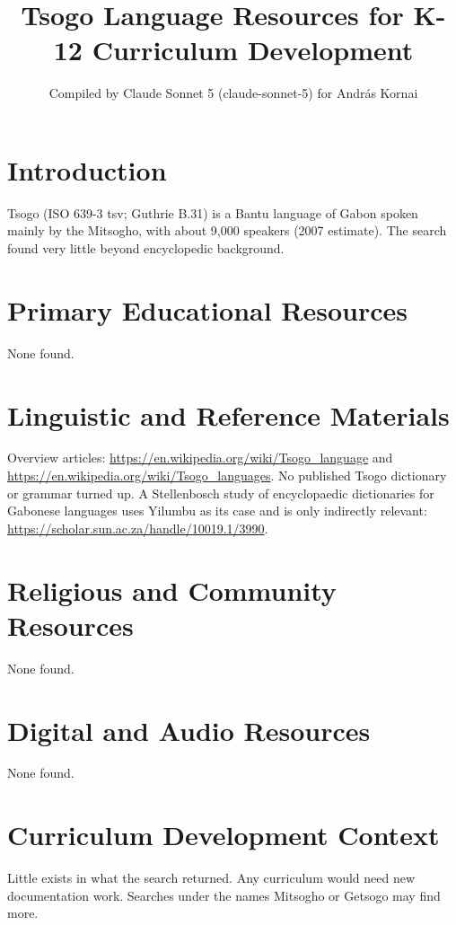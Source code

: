 \documentclass[12pt]{article}
\title{Tsogo Language Resources for K-12 Curriculum Development}
\author{Compiled by Claude Sonnet 5 (claude-sonnet-5) for Andr\'as Kornai}
\date{}
\begin{document}
\maketitle
\section{Introduction}
Tsogo (ISO 639-3 tsv; Guthrie B.31) is a Bantu language of Gabon spoken mainly by the Mitsogho, with about 9,000 speakers (2007 estimate). The search found very little beyond encyclopedic background.
\section{Primary Educational Resources}
None found.
\section{Linguistic and Reference Materials}
Overview articles: \url{https://en.wikipedia.org/wiki/Tsogo_language} and \url{https://en.wikipedia.org/wiki/Tsogo_languages}. No published Tsogo dictionary or grammar turned up. A Stellenbosch study of encyclopaedic dictionaries for Gabonese languages uses Yilumbu as its case and is only indirectly relevant: \url{https://scholar.sun.ac.za/handle/10019.1/3990}.
\section{Religious and Community Resources}
None found.
\section{Digital and Audio Resources}
None found.
\section{Curriculum Development Context}
Little exists in what the search returned. Any curriculum would need new documentation work. Searches under the names Mitsogho or Getsogo may find more.
\end{document}
